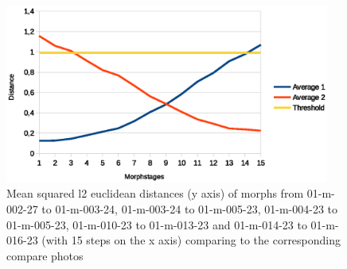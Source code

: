 \begin{figure}[htbp] 
	\centering
		\includegraphics[width=0.95\textwidth]{Resources/result1-5-meanODF.eps}
	\caption{Mean squared l2 euclidean distances (y axis) of morphs from 01-m-002-27 to 01-m-003-24, 01-m-003-24 to 01-m-005-23, 01-m-004-23 to 01-m-005-23, 01-m-010-23 to 01-m-013-23 and 01-m-014-23 to 01-m-016-23 (with 15 steps on the x axis) comparing to the corresponding compare photos}
	\label{fig:Result1-5-mean}
\end{figure}
\newpage
